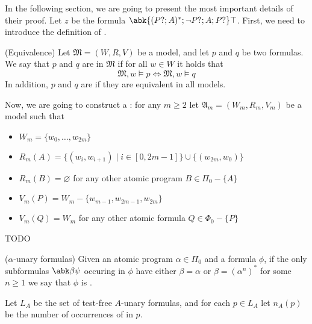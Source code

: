 \documentclass[a4paper, 12pt]{report}
\begin{document}
    In the following section, we are going to present the most important details of their proof. Let $z$ be the formula $\abk{(P?; A)^*; \lnot P ? ; A; P ?}\top$. First, we need to introduce the definition of .

     (Equivalence) Let $\mathfrak M = (W, R, V)$ be a model, and let $p$ and $q$ be two formulas. We say that $p$ and $q$ are  in $\mathfrak M$ if for all $w \in W$ it holds that $$\mathfrak M, w \models p \iff \mathfrak M, w \models q$$ In addition, $p$ and $q$ are  if they are equivalent in all models.

    Now, we are going to construct a : for any $m \ge 2$ let $\mathfrak A_m = (W_m, R_m, V_m)$ be a model such that

    \begin{itemize}
        \item $W_m = \{w_0, \ldots, w_{2m}\}$
        \item $R_m(A) = \{(w_i, w_{i + 1}) \mid i \in [0, 2m - 1]\} \cup \{(w_{2m}, w_0)\}$
        \item $R_m(B) = \varnothing$ for any other atomic program $B \in \Pi_0 - \{A\}$
        \item $V_m(P) = W_m - \{w_{m - 1}, w_{2m - 1}, w_{2m}\}$
        \item $V_m(Q) = W_m$ for any other atomic formula $Q \in \Phi_0 - \{P\}$
    \end{itemize}

    TODO 


     ($\alpha$-unary formulas) Given an atomic program $\alpha \in \Pi_0$ and a formula $\phi$, if the only subformulas $\abk \beta \psi$ occuring in $\phi$ have either $\beta = \alpha$ or $\beta = (\alpha^n)^*$ for some $n \ge 1$ we say that $\phi$ is .

    Let $L_A$ be the set of test-free $A$-unary formulas, and for each $p \in L_A$ let $n_A(p)$ be the number of occurrences of  in $p$.

\end{document}
